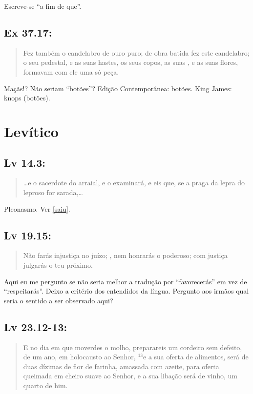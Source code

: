 Escreve-se ``a fim de que''.


\subsection*{Ex 37.17:} 
\begin{quote}
    \small
Fez também o candelabro de ouro puro; de obra batida fez este candelabro; o seu pedestal, e as suas hastes, os seus copos, as suas , e as suas flores, formavam com ele uma só peça.
\end{quote}

Maçãs!? Não seriam ``botões''? Edição Contemporânea: botões. King James:
knops (botões).

\section{Levítico}
\subsection*{Lv 14.3:} 
\begin{quote}
    \small
\ldots e o sacerdote  do arraial, e o examinará, e eis que, se a praga da lepra do leproso for sarada,\ldots
\end{quote}

Pleonasmo. Ver \ref{saiu}.

\subsection*{Lv 19.15:} 
\begin{quote}
    \small
Não farás injustiça no juízo; , nem honrarás o poderoso; com justiça julgarás o teu próximo.
\end{quote}

Aqui eu me pergunto se não seria melhor a tradução por ``favorecerás'' em
vez de ``respeitarás''. Deixo a critério dos entendidos da língua. Pergunto aos irmãos qual seria o sentido a ser observado aqui?

\subsection*{Lv 23.12-13:} 
\begin{quote}
    \small
E no dia em que moverdes o molho, preparareis um cordeiro sem defeito, de um ano, em holocausto ao Senhor, $^{\mathrm{13}}$e a sua oferta de alimentos\uline{,} será de duas dízimas de flor de farinha, amassada com azeite, para oferta queimada em cheiro suave ao Senhor, e a sua libação será de vinho, um quarto de him.
\end{quote}

